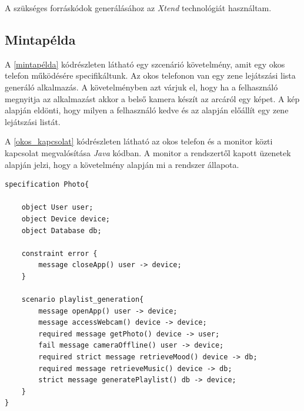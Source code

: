 A szükséges forráskódok generálásához az \textit{Xtend} technológiát használtam.

\clearpage\subsection{Mintapélda}

A \ref{mintapélda} kódrészleten látható egy szcenárió követelmény, amit egy okos telefon működésére specifikáltunk.
Az okos telefonon van egy zene lejátszási lista generáló alkalmazás.
A követelményben azt várjuk el, hogy ha a felhasználó megnyitja az alkalmazást akkor a belső kamera készít az arcáról egy képet.
A kép alapján eldönti, hogy milyen a felhasználó kedve és az alapján előállít egy zene lejátszási listát.

A \ref{okos_kapcsolat} kódrészleten látható az okos telefon és a monitor közti kapcsolat megvalósítása \textit{Java} kódban.
A monitor a rendszertől kapott üzenetek alapján jelzi, hogy a követelmény alapján mi a rendszer állapota.

\begin{lstlisting}[frame=single, float=ht!, caption={Okos telefon működésére megadott scenario követelmény.},captionpos=b, label=mintapélda]
specification Photo{

	object User user;
	object Device device;
	object Database db;

	constraint error {
		message closeApp() user -> device;
	}

	scenario playlist_generation{
		message openApp() user -> device;
		message accessWebcam() device -> device;
		required message getPhoto() device -> user;
		fail message cameraOffline() user -> device;
		required strict message retrieveMood() device -> db;
		required message retrieveMusic() device -> db;
		strict message generatePlaylist() db -> device;
	}
}
\end{lstlisting}


